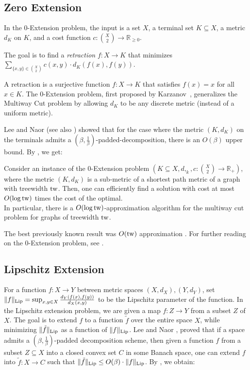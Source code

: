 \documentclass{article}
\newcommand{\tw}{{\rm tw}}
\newcommand{\Lip}{{\rm Lip}}
\newcommand{\ProblemName}[1]{\textsf{#1}}
\newcommand{\ZEX}{\ProblemName{$0$-Extension}\xspace}
\begin{document}
\subsection{Zero Extension}

In the \ZEX problem, the input is a set $X$, a terminal set $K\subseteq X$, 
a metric $d_K$ on $K$, and a cost function 
$c\colon \binom{X}{2} \to \mathbb{R}_{\ge 0}$.

The goal is to find a \emph{retraction} $f:X\rightarrow K$ 
that minimizes $\sum_{\{x,y\}\in \binom{X}{2}} c(x,y)\cdot d_K(f(x),f(y))$.

A retraction is a surjective function $f:X\rightarrow K$ that satisfies $f(x)=x$ for all $x\in K$. The \ZEX problem, first proposed by Karzanov~\cite{Kar98}, 
generalizes the \ProblemName{Multiway Cut} problem \cite{DJPSY92} 
by allowing $d_K$ to be any discrete metric (instead of a uniform metric).

Lee and Naor \cite{LN05} (see also \cite{AFHKTT04,CKR04}) showed that for the case where the metric $(K,d_K)$ on the terminals admits a $(\beta,\frac1\beta)$-padded-decomposition, there is an $O(\beta)$ upper bound. By , we get:

\begin{corollary}\label{cor:0Extension}
	Consider an instance of the \ZEX problem $\left(K\subseteq X,d,_k,c:\binom{X}{2}\rightarrow \mathbb{R}_+\right)$, where the metric $(K,d_K)$ is a sub-metric of a shortest path metric of a graph with treewidth $\tw$. Then, one can efficiently find a solution with cost at most $O(\log\tw)$ times the cost of the optimal.\\
	In particular, there is a $O(\log \tw)$-approximation algorithm for the multiway cut problem for graphs of treewidth $\tw$.	
\end{corollary}
The best previously known result was $O(\tw)$ approximation \cite{CKR04,AGGNT19}. For further reading on the \ZEX problem, see \cite{CKR04,FHRT03,AFHKTT04,LN05,EGKRTT14,FKT19}.


\subsection{Lipschitz Extension}

For a function $f:X\rightarrow Y$ between metric spaces $(X,d_X),(Y,d_Y)$, set $\|f\|_{\Lip}=\sup_{x,y\in X}\frac{d_Y(f(x),f(y))}{d_X(x,y)}$ to be the Lipschitz parameter of the function. In the Lipschitz extension problem, we are given a map $f:Z\rightarrow Y$ from a subset $Z$ of $X$. The goal is to extend $f$ to a function $\tilde{f}$ over the entire space $X$, while minimizing $\|\tilde{f}\|_{\Lip}$ as a function of $\|f\|_{\Lip}$.
Lee and Naor \cite{LN05}, proved that if a space admits a $(\beta,\frac1\beta)$-padded decomposition scheme, then given a function $f$ from a subset $Z\subseteq X$ into a closed convex set $C$ in some Banach space, one can extend $f$ into $\tilde{f}:X\rightarrow C$
such that $\|\tilde{f}\|_{\Lip}\le O(\beta)\cdot \|f\|_{\Lip}$.
By , we obtain:
\end{document}
